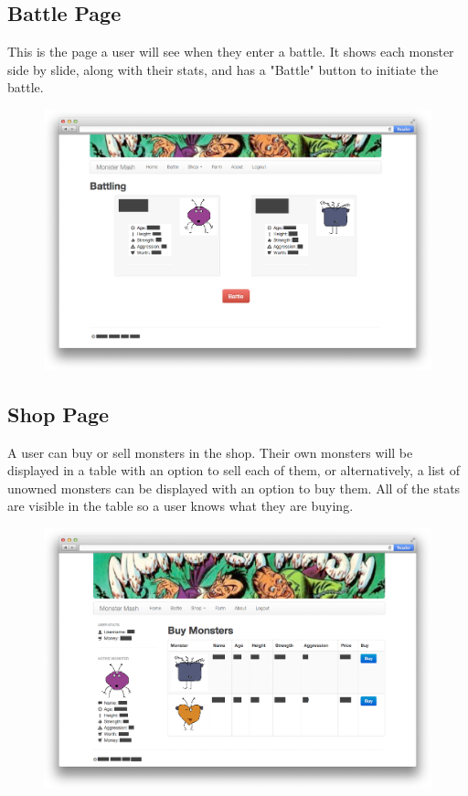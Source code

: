 \subsection{Battle Page}
This is the page a user will see when they enter a battle. It shows each monster side by slide, along with their stats, and has a "Battle" button to initiate the battle.
\begin{figure}[h]
\centering
\includegraphics[width=1.00\textwidth]{battle.png}
\label{fig:battle}
\end{figure}

\subsection{Shop Page}
A user can buy or sell monsters in the shop. Their own monsters will be displayed in a table with an option to sell each of them, or alternatively, a list of unowned monsters can be displayed with an option to buy them. All of the stats are visible in the table so a user knows what they are buying.
\begin{figure}[h]
\centering
\includegraphics[width=1.00\textwidth]{shop.png}
\label{fig:shop}
\end{figure}
